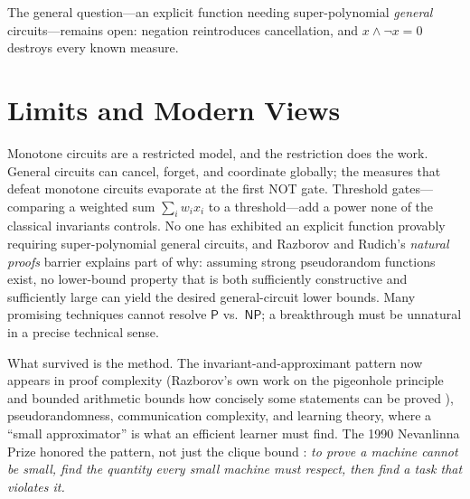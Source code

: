 The general question---an explicit function needing super-polynomial \emph{general} circuits---remains open: negation reintroduces cancellation, and $x\wedge\neg x=0$ destroys every known measure.

\section{Limits and Modern Views}
Monotone circuits are a restricted model, and the restriction does the work. General circuits can cancel, forget, and coordinate globally; the measures that defeat monotone circuits evaporate at the first NOT gate. Threshold gates---comparing a weighted sum $\sum_i w_i x_i$ to a threshold---add a power none of the classical invariants controls. No one has exhibited an explicit function provably requiring super-polynomial general circuits, and Razborov and Rudich's \emph{natural proofs} barrier explains part of why: assuming strong pseudorandom functions exist, no lower-bound property that is both sufficiently constructive and sufficiently large can yield the desired general-circuit lower bounds. Many promising techniques cannot resolve $\textsf{P}$ vs.\ $\textsf{NP}$; a breakthrough must be unnatural in a precise technical sense.

What survived is the method. The invariant-and-approximant pattern now appears in proof complexity (Razborov's own work on the pigeonhole principle and bounded arithmetic bounds how concisely some statements can be proved \cite{razborov-circuit}), pseudorandomness, communication complexity, and learning theory, where a ``small approximator'' is what an efficient learner must find. The 1990 Nevanlinna Prize honored the pattern, not just the clique bound \cite{razborov-monotone}: \emph{to prove a machine cannot be small, find the quantity every small machine must respect, then find a task that violates it.}

